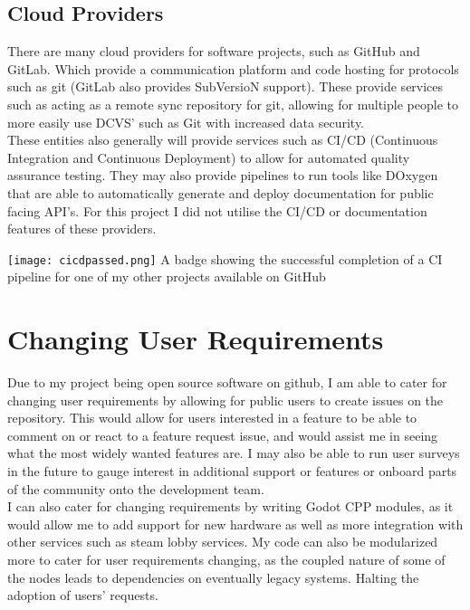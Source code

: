 \documentclass[12pt, DIV=calc]{scrartcl}
\begin{document}
\subsection{Cloud Providers}
There are many cloud providers for software projects, such as GitHub and GitLab. Which provide a communication platform and code hosting for protocols such as git (GitLab also provides SubVersioN support). These provide services such as acting as a remote sync repository for git, allowing for multiple people to more easily use DCVS' such as Git with increased data security.\\

These entities also generally will provide services such as CI/CD (Continuous Integration and Continuous Deployment) to allow for automated quality assurance testing. They may also provide pipelines to run tools like DOxygen that are able to automatically generate and deploy documentation for public facing API's. For this project I did not utilise the CI/CD or documentation features of these providers.

\texttt{[image: cicdpassed.png]}
A badge showing the successful completion of a CI pipeline for one of my other projects available on GitHub\\


\clearpage
\section{Changing User Requirements}
Due to my project being open source software on github, I am able to cater for changing user requirements by allowing for public users to create issues on the repository. This would allow for users interested in a feature to be able to comment on or react to a feature request issue, and would assist me in seeing what the most widely wanted features are. I may also be able to run user surveys in the future to gauge interest in additional support or features or onboard parts of the community onto the development team. \\

I can also cater for changing requirements by writing Godot CPP modules, as it would allow me to add support for new hardware as well as more integration with other services such as steam lobby services. My code can also be modularized more to cater for user requirements changing, as the coupled nature of some of the nodes leads to dependencies on eventually legacy systems. Halting the adoption of users' requests. 
\end{document}
